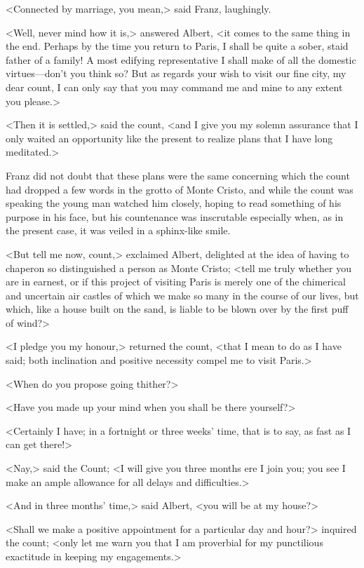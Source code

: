  <Connected by marriage, you mean,> said Franz, laughingly. 

 <Well, never mind how it is,> answered Albert, <it comes to the same thing in the end. Perhaps by the time you return to Paris, I shall be quite a sober, staid father of a family! A most edifying representative I shall make of all the domestic virtues—don't you think so? But as regards your wish to visit our fine city, my dear count, I can only say that you may command me and mine to any extent you please.> 

 <Then it is settled,> said the count, <and I give you my solemn assurance that I only waited an opportunity like the present to realize plans that I have long meditated.> 

 Franz did not doubt that these plans were the same concerning which the count had dropped a few words in the grotto of Monte Cristo, and while the count was speaking the young man watched him closely, hoping to read something of his purpose in his face, but his countenance was inscrutable especially when, as in the present case, it was veiled in a sphinx-like smile. 

 <But tell me now, count,> exclaimed Albert, delighted at the idea of having to chaperon so distinguished a person as Monte Cristo; <tell me truly whether you are in earnest, or if this project of visiting Paris is merely one of the chimerical and uncertain air castles of which we make so many in the course of our lives, but which, like a house built on the sand, is liable to be blown over by the first puff of wind?> 

 <I pledge you my honour,> returned the count, <that I mean to do as I have said; both inclination and positive necessity compel me to visit Paris.> 

 <When do you propose going thither?> 

 <Have you made up your mind when you shall be there yourself?> 

 <Certainly I have; in a fortnight or three weeks' time, that is to say, as fast as I can get there!> 

 <Nay,> said the Count; <I will give you three months ere I join you; you see I make an ample allowance for all delays and difficulties.>

 <And in three months' time,> said Albert, <you will be at my house?> 

 <Shall we make a positive appointment for a particular day and hour?> inquired the count; <only let me warn you that I am proverbial for my punctilious exactitude in keeping my engagements.> 

